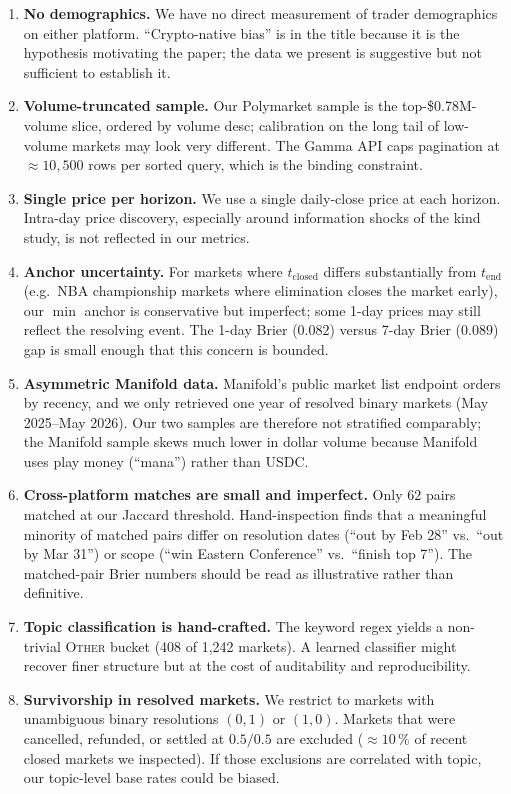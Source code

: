 \documentclass{article}
\begin{document}
\begin{enumerate}
  \item \textbf{No demographics.} We have no direct measurement of
    trader demographics on either platform. ``Crypto-native bias'' is
    in the title because it is the hypothesis motivating the paper;
    the data we present is suggestive but not sufficient to
    establish it.
  \item \textbf{Volume-truncated sample.} Our Polymarket sample is
    the top-\$0.78M-volume slice, ordered by volume desc; calibration
    on the long tail of low-volume markets may look very different.
    The Gamma API caps pagination at $\approx 10{,}500$ rows per
    sorted query, which is the binding constraint.
  \item \textbf{Single price per horizon.} We use a single daily-close
    price at each horizon. Intra-day price discovery, especially
    around information shocks of the kind \citet{tsang2026shocks}
    study, is not reflected in our metrics.
  \item \textbf{Anchor uncertainty.} For markets where
    $t_{\text{closed}}$ differs substantially from $t_{\text{end}}$
    (e.g.\ NBA championship markets where elimination closes the
    market early), our $\min$ anchor is conservative but imperfect;
    some 1-day prices may still reflect the resolving event.
    The 1-day Brier ($0.082$) versus 7-day Brier ($0.089$) gap is
    small enough that this concern is bounded.
  \item \textbf{Asymmetric Manifold data.} Manifold's public market
    list endpoint orders by recency, and we only retrieved one year
    of resolved binary markets (May 2025--May 2026). Our two samples
    are therefore not stratified comparably; the Manifold sample
    skews much lower in dollar volume because Manifold uses play
    money (``mana'') rather than USDC.
  \item \textbf{Cross-platform matches are small and imperfect.}
    Only $62$ pairs matched at our Jaccard threshold. Hand-inspection
    finds that a meaningful minority of matched pairs differ on
    resolution dates (``out by Feb 28'' vs.\ ``out by Mar 31'') or
    scope (``win Eastern Conference'' vs.\ ``finish top 7'').
    The matched-pair Brier numbers should be read as illustrative
    rather than definitive.
  \item \textbf{Topic classification is hand-crafted.} The keyword
    regex yields a non-trivial \textsc{Other} bucket (408 of 1{,}242
    markets). A learned classifier might recover finer structure but
    at the cost of auditability and reproducibility.
  \item \textbf{Survivorship in resolved markets.} We restrict to
    markets with unambiguous binary resolutions $(0,1)$ or $(1,0)$.
    Markets that were cancelled, refunded, or settled at $0.5/0.5$
    are excluded ($\approx 10\,\%$ of recent closed markets we
    inspected). If those exclusions are correlated with topic, our
    topic-level base rates could be biased.
\end{enumerate}
\end{document}
